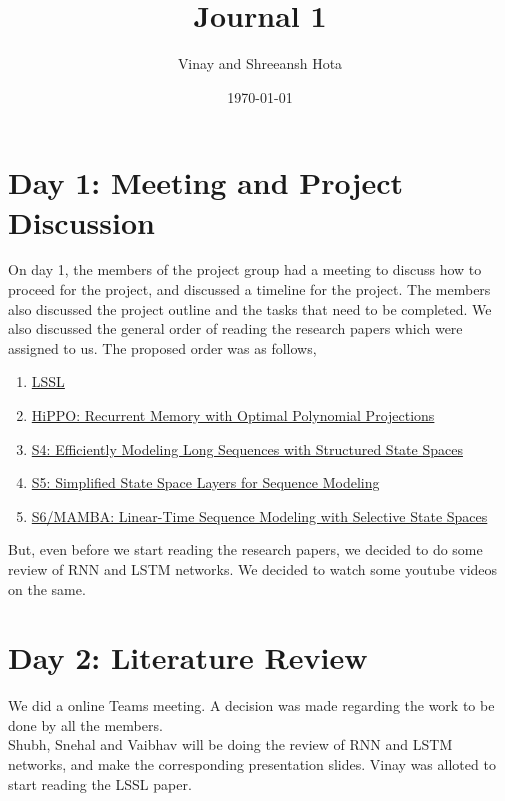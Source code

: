 \documentclass[11pt]{scrartcl}
\title{Journal 1}
\author{Vinay and Shreeansh Hota}
\date{\today}
\begin{document}
\maketitle

\tableofcontents

\section{Day 1: Meeting and Project Discussion}

On day 1, the members of the project group had a meeting to discuss how to proceed for the project, and discussed a timeline for the project. The members also discussed the project outline and the tasks that need to be completed. We also discussed the general order of reading the research papers which were assigned to us. The proposed order was as follows,

\begin{enumerate}
    \item \href{https://arxiv.org/pdf/2110.13985}{LSSL}
    \item \href{https://arxiv.org/pdf/2008.07669}{HiPPO: Recurrent Memory with Optimal Polynomial Projections}
    \item \href{https://arxiv.org/pdf/2111.00396}{S4: Efficiently Modeling Long Sequences with Structured State Spaces}
    \item \href{https://arxiv.org/pdf/2208.04933}{S5: Simplified State Space Layers for Sequence Modeling}
    \item \href{https://arxiv.org/pdf/2312.00752}{S6/MAMBA: Linear-Time Sequence Modeling with Selective State Spaces}
\end{enumerate}

But, even before we start reading the research papers, we decided to do some review of RNN and LSTM networks. We decided to watch some youtube videos on the same.

\section{Day 2: Literature Review}
We did a online Teams meeting. A decision was made regarding the work to be done by all the members.\\

Shubh, Snehal and Vaibhav will be doing the review of RNN and LSTM networks, and make the corresponding presentation slides. Vinay was alloted to start reading the LSSL paper. \\
\end{document}
